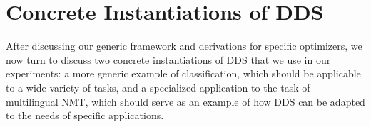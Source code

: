 \section{\label{sec:formualtion}Concrete Instantiations of DDS}

After discussing our generic framework and derivations for specific optimizers, we now turn to discuss two concrete instantiations of DDS that we use in our experiments: a more generic example of classification, which should be applicable to a wide variety of tasks, and a specialized application to the task of multilingual NMT, which should serve as an example of how DDS can be adapted to the needs of specific applications.



